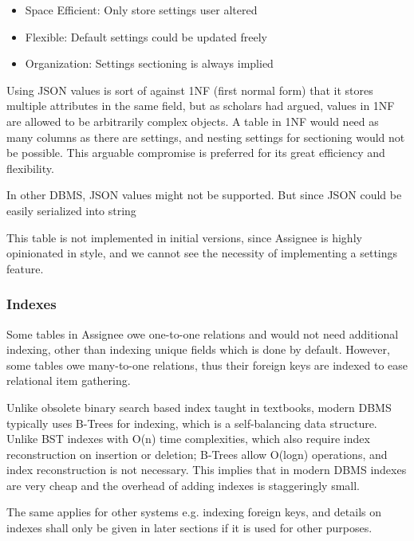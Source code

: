 \begin{itemize}
	\item Space Efficient: Only store settings user altered

	\item Flexible: Default settings could be updated freely

	\item Organization: Settings sectioning is always implied
\end{itemize}

Using JSON values is sort of against 1NF (first normal form) that it stores
multiple attributes in the same field, but as scholars had argued, values in 1NF
are allowed to be arbitrarily complex objects. A table in 1NF would need as many
columns as there are settings, and nesting settings for sectioning would not be
possible. This arguable compromise is preferred for its great efficiency and flexibility.

\textdagger{} In other DBMS, JSON values might not be supported. But since JSON
could be easily serialized into string

\textdagger{} This table is not implemented in initial versions, since Assignee is
highly opinionated in style, and we cannot see the necessity of implementing a
settings feature.

\subsubsection{Indexes}
\label{data-layer.design.user.indexes}

Some tables in Assignee owe one-to-one relations and would not need additional indexing,
other than indexing unique fields which is done by default. However, some tables
owe many-to-one relations, thus their foreign keys are indexed to ease relational
item gathering.

Unlike obsolete binary search based index taught in textbooks, modern DBMS
typically uses B-Trees for indexing, which is a self-balancing data structure.
Unlike BST indexes with O(n) time complexities, which also require index
reconstruction on insertion or deletion; B-Trees allow O(logn) operations, and index
reconstruction is not necessary. This implies that in modern DBMS indexes are
very cheap and the overhead of adding indexes is staggeringly small.

The same applies for other systems e.g. indexing foreign keys, and details on
indexes shall only be given in later sections if it is used for other purposes.

